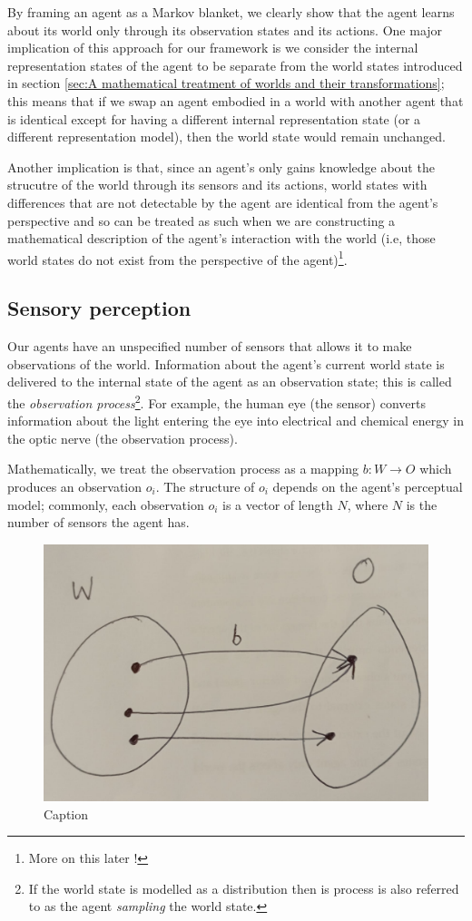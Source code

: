 By framing an agent as a Markov blanket, we clearly show that the agent learns about its world only through its observation states and its actions.
One major implication of this approach for our framework is we consider the internal representation states of the agent to be separate from the world states introduced in section \ref{sec:A mathematical treatment of worlds and their transformations}; this means that if we swap an agent embodied in a world with another agent that is identical except for having a different internal representation state (or a different representation model), then the world state would remain unchanged.

Another implication is that, since an agent's only gains knowledge about the strucutre of the world through its sensors and its actions, world states with differences that are not detectable by the agent are identical from the agent's perspective and so can be treated as such when we are constructing a mathematical description of the agent's interaction with the world (i.e, those world states do not exist from the perspective of the agent)\footnote{More on this later !}.

\subsection{Sensory perception}

Our agents have an unspecified number of sensors that allows it to make observations of the world.
Information about the agent's current world state is delivered to the internal state of the agent as an observation state; this is called the \emph{observation process}\footnote{If the world state is modelled as a distribution then is process is also referred to as the agent \emph{sampling} the world state.}.
For example, the human eye (the sensor) converts information about the light entering the eye into
electrical and chemical energy in the optic nerve (the observation process).

Mathematically, we treat the observation process as a mapping $b: W \to O$ which produces an observation $o_{i}$.
The structure of $o_{i}$ depends on the agent's perceptual model; commonly, each observation $o_{i}$ is a vector of length $N$, where $N$ is the number of sensors the agent has.

\begin{figure}
    \centering
    \includegraphics[width=0.5\linewidth]{2MathematicalFramework/InitialFramework/Images/observation_process_W_to_O.jpeg}
    \caption{Caption}
    \label{fig:observation_process_W_to_O}
\end{figure}

